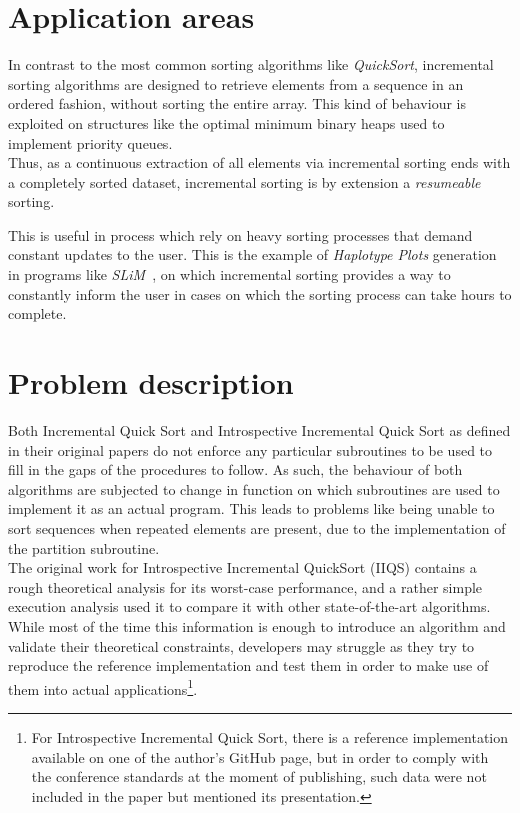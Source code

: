 \section{Application areas}

In contrast to the most common sorting algorithms like \emph{QuickSort}, incremental sorting algorithms are designed to retrieve elements from a sequence in an ordered fashion, without sorting the entire array. This kind of behaviour is exploited on structures like the optimal minimum binary heaps used to implement priority queues. \\

Thus, as a continuous extraction of all elements via incremental sorting ends with a completely sorted dataset, incremental sorting is by extension a \emph{resumeable} sorting.

This is useful in process which rely on heavy sorting processes that demand constant updates to the user. This is the example of \emph{Haplotype Plots} generation in programs like \emph{SLiM}~\cite{msw211}, on which incremental sorting provides a way to constantly inform the user in cases on which the sorting process can take hours to complete.\\

\section{Problem description}
Both Incremental Quick Sort and Introspective Incremental Quick Sort as defined in their original papers \cite{7416566} do not enforce any particular subroutines to be used to fill in the gaps of the procedures to follow. As such, the behaviour of both algorithms are subjected to change in function on which subroutines are used to implement it as an actual program. This leads to problems like being unable to sort sequences when repeated elements are present, due to the implementation of the partition subroutine.\\

The original work for Introspective Incremental QuickSort (IIQS) \cite{7416566} contains a rough theoretical analysis for its worst-case performance, and a rather simple execution analysis used it to compare it with other state-of-the-art algorithms. While most of the time this information is enough to introduce an algorithm and validate their theoretical constraints, developers may struggle as they try to reproduce the reference implementation and test them in order to make use of them into actual applications\footnote{For Introspective Incremental Quick Sort, there is a reference implementation available on one of the author's GitHub page, but in order to comply with the conference standards at the moment of publishing, such data were not included in the paper but mentioned its presentation.}.\\ 

